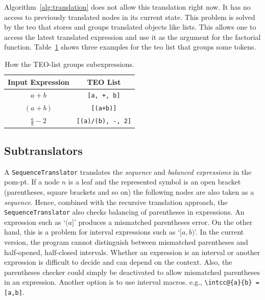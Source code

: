 \documentclass[a4paper,11pt]{article}
\theoremstyle{defTheoStyle}
\theoremstyle{defExampStyle}
\begin{document}
Algorithm~\ref{alg:translation} does not allow this translation right now. It has no access to previously translated nodes in its current state. This problem is solved by the \gls*{teo} that stores and groups translated objects like lists. This allows one to access the latest translated expression and use it as the argument for the factorial function. Table~\ref{tab:teo-list} shows three examples for the \gls*{teo} list that groups some tokens.

\begin{table}[ht]
\centering
\begin{tabular}{cc}
	\hline
	Input Expression & TEO List\\
	\hline
	$a+b$ & \verb|[a, +, b]|\\
	$(a+b)$ & \verb|[(a+b)]|\\
	$\frac{a}{b}-2$ & \verb|[(a)/(b), -, 2]|\\
	\hline
\end{tabular}
\caption{How the TEO-list groups subexpressions.}
\label{tab:teo-list}
\end{table}

\subsection{Subtranslators}\label{sec:subtranslators}

A \verb|SequenceTranslator| translates the \textit{sequence} and \textit{balanced expressions} in the \gls*{pom-pt}. If a node $n$ is a leaf and the represented symbol is an open bracket (parentheses, square brackets and so on) the following nodes are also taken as a \textit{sequence}. Hence, combined with the recursive translation approach, the \verb|SequenceTranslator| also checks balancing of parentheses in expressions. An expression such as `$(a]$' produces a mismatched parentheses error. On the other hand, this is a problem for interval expressions such as `$[a,b)$'. In the current version, the program cannot distinguish between mismatched parentheses and half-opened, half-closed intervals. Whether an expression is an interval or another expression is difficult to decide and can depend on the context. Also, the parentheses checker could simply be deactivated to allow mismatched parentheses in an expression. Another option is to use interval macros. e.g., \verb|\intcc@{a}{b} = [a,b]|.
\end{document}
